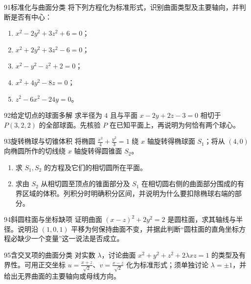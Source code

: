 \begin{exercise}{91}{标准化与曲面分类}
将下列方程化为标准形式，识别曲面类型及主要轴向，并判断是否有中心：
\begin{enumerate}
\item $x^2-2y^2+3z^2+6=0$；
\item $x^2+2y^2+3z^2-6=0$；
\item $x^2-y^2-z^2+2=0$；
\item $x^2+4y^2-8z=0$；
\item $z^2-6x^2-24y=0$。
\end{enumerate}
\end{exercise}
\begin{exercise}{92}{给定切点的球面多解}
求半径为 $4$ 且与平面 $x-2y+2z-3=0$ 相切于 $P(3,2,2)$ 的全部球面。先核验 $P$ 在已知平面上，再说明为何恰有两个球心。
\end{exercise}
\begin{exercise}{93}{旋转椭球与切锥体积}
将椭圆 $\frac{x^2}4+\frac{y^2}3=1$ 绕 $x$ 轴旋转得椭球面 $S_1$；将从 $(4,0)$ 向椭圆所作的切线绕 $x$ 轴旋转得圆锥面 $S_2$。
\begin{enumerate}
\item 求 $S_1,S_2$ 的方程及它们的相切圆所在平面。
\item 求由 $S_2$ 从相切圆至顶点的锥面部分及 $S_1$ 在相切圆右侧的曲面部分围成的有界区域的体积。列积分时明确积分区间，并说明为什么要扣除椭球右端的部分。
\end{enumerate}
\end{exercise}
\begin{exercise}{94}{斜圆柱面与坐标缺项}
证明曲面 $(x-z)^2+2y^2=2$ 是圆柱面，求其轴线与半径。说明沿 $(1,0,1)$ 平移为何保持曲面不变，并据此判断“圆柱面的直角坐标方程必缺少一个变量”这一说法是否成立。
\end{exercise}
\begin{exercise}{95}{含交叉项的曲面分类}
对实数 $\lambda$，讨论曲面 $x^2+y^2+z^2+2\lambda xz=1$ 的类型及有界性。可用正交坐标 $u=\frac{x+z}{\sqrt2}$、$v=\frac{x-z}{\sqrt2}$ 化为标准形式；须单独讨论 $\lambda=\pm1$，并给出无界曲面的主要轴向或母线方向。
\end{exercise}
